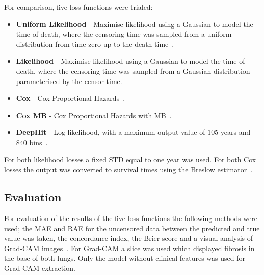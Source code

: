         For comparison, five loss functions were trialed:

        \begin{itemize}
            \item \textbf{Uniform Likelihood} - Maximise likelihood using a Gaussian to model the time of death, where the censoring time was sampled from a uniform distribution from time zero up to the death time~\cite{Shahin2023DeepAnalysis}.

            \item \textbf{Likelihood} - Maximise likelihood using a Gaussian to model the time of death, where the censoring time was sampled from a Gaussian distribution parameterised by the censor time.

            \item \textbf{Cox} - Cox Proportional Hazards~\cite{Cox1972RegressionLife-Tables}.

            \item \textbf{Cox \gls{MB}} - Cox Proportional Hazards with \gls{MB}~\cite{Shahin2022SurvivalData}.

            \item \textbf{DeepHit} - Log-likelihood, with a maximum output value of $105$ years and $840$ bins~\cite{Lee2018DeepHit:Risks}.
        \end{itemize}

        For both likelihood losses a fixed \gls{STD} equal to one year was used. For both Cox losses the output was converted to survival times using the Breslow estimator~\cite{Breslow1974CovarianceData}.

    \vspace{-0.5cm}

    \subsection{Evaluation} \label{sec:evaluation}
        For evaluation of the results of the five loss functions the following methods were used; the \gls{MAE} and \gls{RAE} for the uncensored data between the predicted and true value was taken, the concordance index, the Brier score and a visual analysis of Grad-CAM images~\cite{Raykar2008OnIndex, Gerds2006ConsistentTimes, Selvaraju2020Grad-CAM:Localization}. For Grad-CAM a slice was used which displayed fibrosis in the base of both lungs. Only the model without clinical features was used for Grad-CAM extraction.
